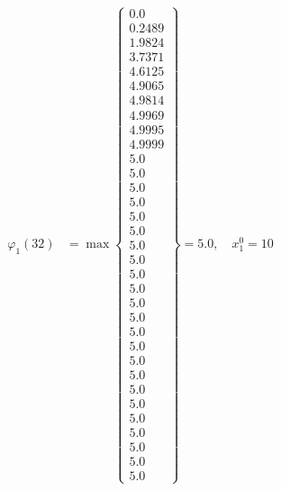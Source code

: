 \documentclass{article}
\begin{document}
\begin{align*}
\varphi_{1}(32) &= \max \left\{ \begin{array}{c}
0.0 \\
 0.2489 \\
 1.9824 \\
 3.7371 \\
 4.6125 \\
 4.9065 \\
 4.9814 \\
 4.9969 \\
 4.9995 \\
 4.9999 \\
 5.0 \\
 5.0 \\
 5.0 \\
 5.0 \\
 5.0 \\
 5.0 \\
 5.0 \\
 5.0 \\
 5.0 \\
 5.0 \\
 5.0 \\
 5.0 \\
 5.0 \\
 5.0 \\
 5.0 \\
 5.0 \\
 5.0 \\
 5.0 \\
 5.0 \\
 5.0 \\
 5.0 \\
 5.0 \\
 5.0
\end{array} \right\}=5.0, \quad x_{1}^0=10\\
  

\end{align*}
\end{document}
